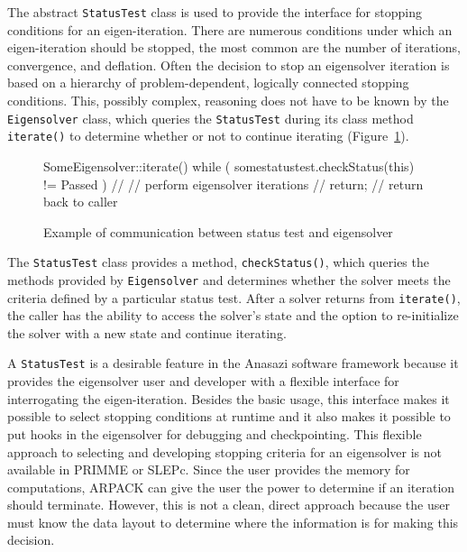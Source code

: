 \documentclass[acmtoms]{acmtrans2m}
\newcommand{\aspace}[1]{\texttt{#1}}
\begin{document}
The abstract \aspace{StatusTest} class is used to provide the interface for stopping 
conditions for an eigen-iteration. There are numerous conditions under which an eigen-iteration 
should be stopped, the most common are the number of iterations, convergence, and deflation.
Often the decision to stop an eigensolver iteration is based on a hierarchy 
of problem-dependent, logically connected stopping conditions.
This, possibly complex, reasoning does not have to be known by the \aspace{Eigensolver} class,
which queries the \aspace{StatusTest} during its class method \aspace{iterate()} to determine 
whether or not to continue iterating (Figure~\ref{fig:comm}).
\begin{figure}[htb]
\begin{center}
\begin{boxedverbatim}
SomeEigensolver::iterate() {
  while ( somestatustest.checkStatus(this) != Passed ) {
    //
    // perform eigensolver iterations
    //
  }
  return;  // return back to caller
}
\end{boxedverbatim}
\end{center}
\caption{Example of communication between status test and eigensolver}
\label{fig:comm}
\end{figure}
The \aspace{StatusTest} class provides a method, \verb!checkStatus()!, which queries the methods provided by
\aspace{Eigensolver} and determines whether the solver meets the criteria defined by a particular 
status test. After a solver returns from \verb!iterate()!, the caller has the ability to access the
solver's state and the option to re-initialize the solver with a new state and continue iterating.

A \aspace{StatusTest} is a desirable feature in the Anasazi software framework because it
provides the eigensolver user and developer with a flexible interface for interrogating the eigen-iteration.
Besides the basic usage, this interface makes it possible to select stopping conditions at runtime 
and it also makes it possible to put hooks in the eigensolver for debugging and checkpointing.
This flexible approach to selecting and developing stopping criteria for an eigensolver is not
available in PRIMME or SLEPc.  Since the user provides the memory for computations, ARPACK can give the
user the power to determine if an iteration should terminate.  However, this is not a clean, direct 
approach because the user must know the data layout to determine where the information is for making
this decision.
\end{document}
